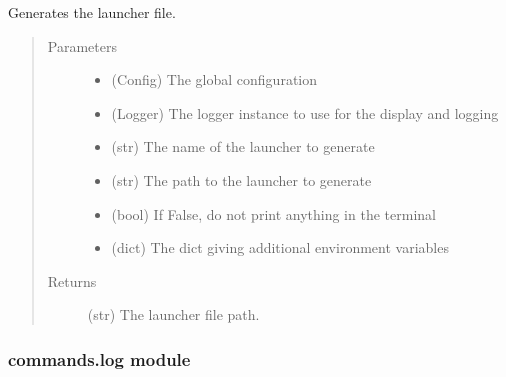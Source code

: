 \documentclass[a4paper,10pt,english]{sphinxmanual}
\begin{document}

\begin{fulllineitems}
\label{\detokenize{apidoc_commands/commands:commands.launcher.generate_launch_file}}
Generates the launcher file.
\begin{quote}\begin{description}
\item[{Parameters}] \leavevmode\begin{itemize}
\item {} 
 \textendash{} (Config) The global configuration

\item {} 
 \textendash{} (Logger) 
The logger instance to use for the display and logging

\item {} 
 \textendash{} (str) The name of the launcher to generate

\item {} 
 \textendash{} (str) The path to the launcher to generate

\item {} 
 \textendash{} (bool) If False, do not print anything in the terminal

\item {} 
 \textendash{} (dict) 
The dict giving additional environment variables

\end{itemize}

\item[{Returns}] \leavevmode
(str) The launcher file path.

\end{description}\end{quote}

\end{fulllineitems}



\subsubsection{commands.log module}
\label{\detokenize{apidoc_commands/commands:commands-log-module}}\label{\detokenize{apidoc_commands/commands:module-commands.log}}
\end{document}
